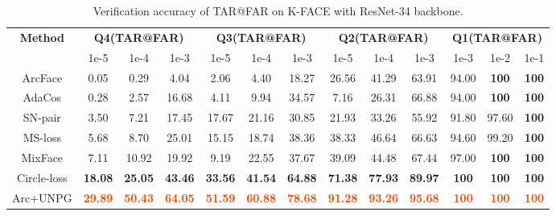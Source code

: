 \documentclass[10pt,twocolumn]{article}
\begin{document}
\begin{table*}[!tb]
    \caption{Verification accuracy of TAR@FAR on K-FACE with ResNet-34 backbone.}
    \label{tab:K-FACE}
      \centering
        {\small
        \begin{tabular}[]{ c c c c c c c c c c c c c }
         \hline
         \multirow{2}{*}{\textbf{Method}} & \multicolumn{3}{c}{\textbf{Q4(TAR@FAR)}} & \multicolumn{3}{c}{\textbf{Q3(TAR@FAR)}} & \multicolumn{3}{c}{\textbf{Q2(TAR@FAR)}} & \multicolumn{3}{c}{\textbf{Q1(TAR@FAR)}} \\
         \cline{2-13}
         & 1e-5  & 1e-4 & 1e-3 & 1e-5 & 1e-4 & 1e-3 & 1e-5 & 1e-4 & 1e-3 & 1e-3 & 1e-2 & 1e-1 \\
         \hline
         ArcFace & 0.05 & 0.29 & 4.04 & 2.06 & 4.40 & 18.27 & 26.56 & 41.29 & 63.91 & 94.00 & \textbf{\textcolor{NavyBlue}{100}} & \textbf{\textcolor{NavyBlue}{100}} \\
         AdaCos & 0.28 & 2.57 & 16.68 & 4.11 & 9.94 & 34.57 & 7.16 & 26.31 & 66.88 & 94.00 & \textbf{\textcolor{NavyBlue}{100}} & \textbf{\textcolor{NavyBlue}{100}} \\
         SN-pair\cite{jung2021mixface} & 3.50 & 7.21 & 17.45 & 17.67 & 21.16 & 30.85 & 21.93 & 33.26 & 55.92 & 91.80 & 97.60 & \textbf{\textcolor{NavyBlue}{100}} \\
         MS-loss\cite{wang2019multi} & 5.68	& 8.70 & 25.01 & 15.15 & 18.74 & 38.36 & 38.33 & 46.64 & 66.63 & 94.60 & 99.20 & \textbf{\textcolor{NavyBlue}{100}} \\
         MixFace\cite{jung2021mixface} & 7.11 & 10.92 & 19.92 & 9.19 & 22.55 & 37.67 & 39.09 & 44.48 & 67.44 & 97.00 & \textbf{\textcolor{NavyBlue}{100}} & \textbf{\textcolor{NavyBlue}{100}} \\
         Circle-loss\cite{sun2020circle} &\textbf{\textcolor{NavyBlue}{18.08}} & \textbf{\textcolor{NavyBlue}{25.05}} & \textbf{\textcolor{NavyBlue}{43.46}} & \textbf{\textcolor{NavyBlue}{33.56}} & \textbf{\textcolor{NavyBlue}{41.54}} & \textbf{\textcolor{NavyBlue}{64.88}} & \textbf{\textcolor{NavyBlue}{71.38}} & \textbf{\textcolor{NavyBlue}{77.93}} & \textbf{\textcolor{NavyBlue}{89.97}} & \textbf{\textcolor{NavyBlue}{100}} & \textbf{\textcolor{NavyBlue}{100}} & \textbf{\textcolor{NavyBlue}{100}} \\
         \hline
         \rowcolor{lightgray!20}
         Arc+UNPG &\textbf{\textcolor{OrangeRed}{29.89}} & \textbf{\textcolor{OrangeRed}{50.43}} & \textbf{\textcolor{OrangeRed}{64.05}} & \textbf{\textcolor{OrangeRed}{51.59}} & \textbf{\textcolor{OrangeRed}{60.88}} & \textbf{\textcolor{OrangeRed}{78.68}} & \textbf{\textcolor{OrangeRed}{91.28}} & \textbf{\textcolor{OrangeRed}{93.26}} & \textbf{\textcolor{OrangeRed}{95.68}} & \textbf{\textcolor{OrangeRed}{100}} & \textbf{\textcolor{OrangeRed}{100}} & \textbf{\textcolor{OrangeRed}{100}} \\
         \hline
        \end{tabular}
        }
\end{table*}
\end{document}
